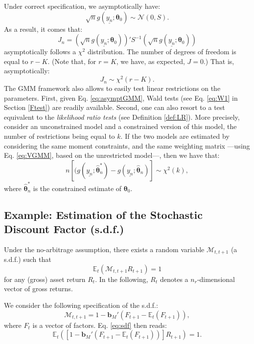 \documentclass[
  12pt,
]{book}
\theoremstyle{definition}
\theoremstyle{definition}
\theoremstyle{definition}
\theoremstyle{definition}
\theoremstyle{remark}
\begin{document}
Under correct specification, we asymptotically have:
\[
\sqrt{n}g(\underline{y_n};{\boldsymbol\theta}_0)  \sim \mathcal{N}(0,S).
\]
As a result, it comes that:
\begin{equation}
J_n = \left(\sqrt{n}g(\underline{y_n};{\boldsymbol\theta}_0)\right)'S^{-1}\left(\sqrt{n}g(\underline{y_n};{\boldsymbol\theta}_0)\right) \label{eq:HansenSargan}
\end{equation}
asymptotically follows a \(\chi^2\) distribution. The number of degrees of freedom is equal to \(r-K\). (Note that, for \(r=K\), we have, as expected, \(J=0\).) That is, asymptotically:
\[
J_n \sim \chi^2(r-K).
\]
The GMM framework also allows to easily test linear restrictions on the parameters. First, given Eq. \eqref{eq:asymptGMM}, Wald tests (see Eq. \eqref{eq:W1} in Section \ref{Ftest}) are readily available. Second, one can also resort to a test equivalent to the \emph{likelihood ratio tests} (see Definition \ref{def:LR}). More precisely, consider an unconstrained model and a constrained version of this model, the number of restrictions being equal to \(k\). If the two models are estimated by considering the same moment constraints, and the same weighting matrix ---using Eq. \eqref{eq:VGMM}, based on the unrestricted model---, then we have that:
\[
n \left[(g(\underline{y_n};\hat{{\boldsymbol\theta}}^*_n)-g(\underline{y_n};\hat{{\boldsymbol\theta}}_n)\right] \sim \chi^2(k),
\]
where \(\hat{{\boldsymbol\theta}}^*_n\) is the constrained estimate of \({\boldsymbol\theta}_0\).

\hypertarget{example-estimation-of-the-stochastic-discount-factor-s.d.f.}{%
\subsection{Example: Estimation of the Stochastic Discount Factor (s.d.f.)}\label{example-estimation-of-the-stochastic-discount-factor-s.d.f.}}

Under the no-arbitrage assumption, there exists a random variable \(\mathcal{M}_{t,t+1}\) (a s.d.f.) such that
\[
\mathbb{E}_t(\mathcal{M}_{t,t+1}R_{t+1})=1
\]
for any (gross) asset return \(R_t\). In the following, \(R_t\) denotes a \(n_r\)-dimensional vector of gross returns.

We consider the following specification of the s.d.f.:
\begin{equation}
\mathcal{M}_{t,t+1} = 1 - \textbf{b}_M'(F_{t+1} - \mathbb{E}_t(F_{t+1})), \label{eq:sdf}
\end{equation}
where \(F_t\) is a vector of factors. Eq. \eqref{eq:sdf} then reads:
\[
\mathbb{E}_t([1 - \textbf{b}_M'(F_{t+1} - \mathbb{E}_t(F_{t+1}))]R_{t+1})=1.
\]
\end{document}
